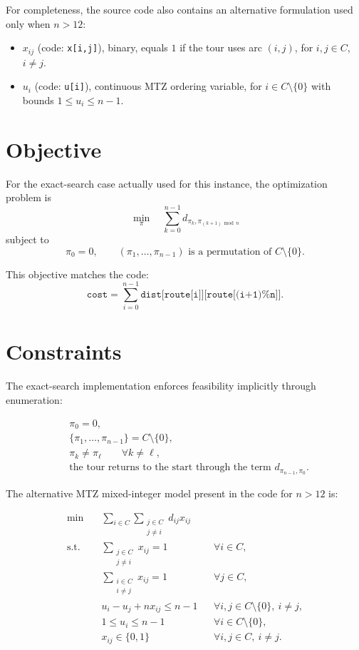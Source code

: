 For completeness, the source code also contains an alternative formulation used only when $n>12$:

\begin{itemize}
    \item $x_{ij}$ (code: \texttt{x[i,j]}), binary, equals $1$ if the tour uses arc $(i,j)$, for $i,j\in C$, $i\ne j$.
    \item $u_i$ (code: \texttt{u[i]}), continuous MTZ ordering variable, for $i\in C\setminus\{0\}$ with bounds $1 \le u_i \le n-1$.
\end{itemize}

\section*{Objective}

For the exact-search case actually used for this instance, the optimization problem is
\[
\min_{\pi} \quad \sum_{k=0}^{n-1} d_{\pi_k,\pi_{(k+1)\bmod n}}
\]
subject to
\[
\pi_0 = 0,
\qquad
(\pi_1,\dots,\pi_{n-1}) \text{ is a permutation of } C\setminus\{0\}.
\]

This objective matches the code:
\[
\texttt{cost} = \sum_{i=0}^{n-1} \texttt{dist[route[i]][route[(i+1)\%n]]}.
\]

\section*{Constraints}

The exact-search implementation enforces feasibility implicitly through enumeration:

\begin{align*}
&\pi_0 = 0,\\
&\{\pi_1,\dots,\pi_{n-1}\} = C\setminus\{0\},\\
&\pi_k \ne \pi_\ell \qquad \forall k\ne \ell,\\
&\text{the tour returns to the start through the term } d_{\pi_{n-1},\pi_0}.
\end{align*}

The alternative MTZ mixed-integer model present in the code for $n>12$ is:

\begin{align*}
\min \quad & \sum_{i\in C}\sum_{\substack{j\in C\\j\ne i}} d_{ij} x_{ij}\\
\text{s.t.}\quad
&\sum_{\substack{j\in C\\j\ne i}} x_{ij} = 1 && \forall i\in C,\\
&\sum_{\substack{i\in C\\i\ne j}} x_{ij} = 1 && \forall j\in C,\\
&u_i - u_j + n x_{ij} \le n-1 && \forall i,j\in C\setminus\{0\},\ i\ne j,\\
&1 \le u_i \le n-1 && \forall i\in C\setminus\{0\},\\
&x_{ij}\in\{0,1\} && \forall i,j\in C,\ i\ne j.
\end{align*}

